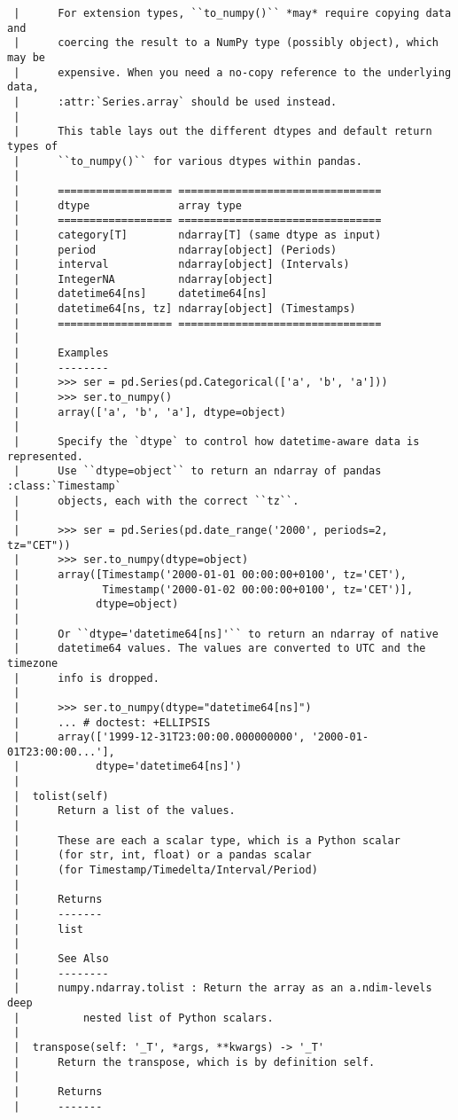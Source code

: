 \documentclass[
  letterpaper,
  DIV=11,
  numbers=noendperiod]{scrreprt}
\begin{document}
\begin{verbatim}
 |      For extension types, ``to_numpy()`` *may* require copying data and
 |      coercing the result to a NumPy type (possibly object), which may be
 |      expensive. When you need a no-copy reference to the underlying data,
 |      :attr:`Series.array` should be used instead.
 |      
 |      This table lays out the different dtypes and default return types of
 |      ``to_numpy()`` for various dtypes within pandas.
 |      
 |      ================== ================================
 |      dtype              array type
 |      ================== ================================
 |      category[T]        ndarray[T] (same dtype as input)
 |      period             ndarray[object] (Periods)
 |      interval           ndarray[object] (Intervals)
 |      IntegerNA          ndarray[object]
 |      datetime64[ns]     datetime64[ns]
 |      datetime64[ns, tz] ndarray[object] (Timestamps)
 |      ================== ================================
 |      
 |      Examples
 |      --------
 |      >>> ser = pd.Series(pd.Categorical(['a', 'b', 'a']))
 |      >>> ser.to_numpy()
 |      array(['a', 'b', 'a'], dtype=object)
 |      
 |      Specify the `dtype` to control how datetime-aware data is represented.
 |      Use ``dtype=object`` to return an ndarray of pandas :class:`Timestamp`
 |      objects, each with the correct ``tz``.
 |      
 |      >>> ser = pd.Series(pd.date_range('2000', periods=2, tz="CET"))
 |      >>> ser.to_numpy(dtype=object)
 |      array([Timestamp('2000-01-01 00:00:00+0100', tz='CET'),
 |             Timestamp('2000-01-02 00:00:00+0100', tz='CET')],
 |            dtype=object)
 |      
 |      Or ``dtype='datetime64[ns]'`` to return an ndarray of native
 |      datetime64 values. The values are converted to UTC and the timezone
 |      info is dropped.
 |      
 |      >>> ser.to_numpy(dtype="datetime64[ns]")
 |      ... # doctest: +ELLIPSIS
 |      array(['1999-12-31T23:00:00.000000000', '2000-01-01T23:00:00...'],
 |            dtype='datetime64[ns]')
 |  
 |  tolist(self)
 |      Return a list of the values.
 |      
 |      These are each a scalar type, which is a Python scalar
 |      (for str, int, float) or a pandas scalar
 |      (for Timestamp/Timedelta/Interval/Period)
 |      
 |      Returns
 |      -------
 |      list
 |      
 |      See Also
 |      --------
 |      numpy.ndarray.tolist : Return the array as an a.ndim-levels deep
 |          nested list of Python scalars.
 |  
 |  transpose(self: '_T', *args, **kwargs) -> '_T'
 |      Return the transpose, which is by definition self.
 |      
 |      Returns
 |      -------

\end{verbatim}
\end{document}
